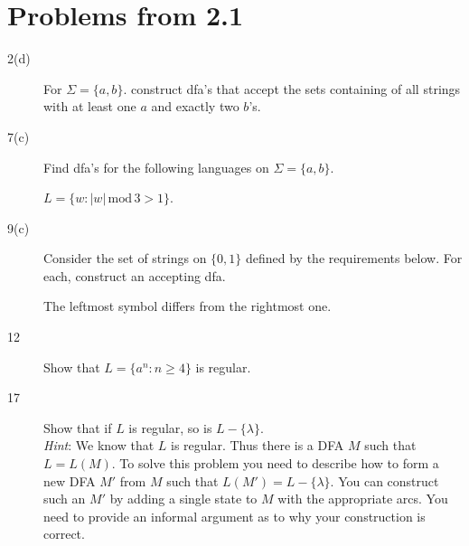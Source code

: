 \documentclass[12pt]{article}
\begin{document}
%
\section*{Problems from 2.1}

\begin{description}
    \item[2(d)] For $\Sigma = \{a, b\}$. construct dfa's that accept the
                sets containing of all strings with at least one $a$ and
                exactly two $b$'s.
\end{description}


\begin{description}
    \item[7(c)] Find dfa's for the following languages on $\Sigma = \{a, b\}$.

                $L = \{w : |w|\, \mathrm{mod}\, 3 > 1\}$.
\end{description}

\begin{description}
    \item[9(c)] Consider the set of strings on $\{0, 1\}$ defined by the
                requirements below.  For each, construct an accepting dfa.

                The leftmost symbol differs from the rightmost one.
\end{description}

\begin{description}
    \item[12] Show that $L = \{a^n : n \ge 4\}$ is regular.

    \item[17] Show that if $L$ is regular, so is $L - \{\lambda\}$.\\
              \emph{Hint}: We know that $L$ is regular. Thus there is a
              DFA $M$ such that $L = L(M)$. To solve this problem you
              need to describe how to form a new DFA $M'$ from $M$ such
              that $L(M') = L - \{\lambda\}$.  You can construct such an
              $M'$ by adding a single state to $M$ with the appropriate
              arcs. You need to provide an informal argument as to why
              your construction is correct.

\end{description}
\end{document}
